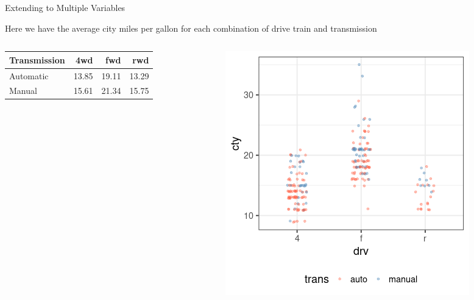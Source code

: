 \documentclass{beamer}
\begin{document}
\begin{frame}[fragile]{Extending to Multiple Variables}

Here we have the average city miles per gallon for each combination of drive train and transmission



\begin{columns}

  \begin{column}{0.45\textwidth}
  {\footnotesize
\begin{table}[ht]
\centering
\begin{tabular}{lrrr}
  \hline
Transmission & 4wd & fwd & rwd \\ 
  \hline
Automatic &  13.85 & 19.11 & 13.29 \\
Manual & 15.61 & 21.34 & 15.75 \\  \hline
\end{tabular}
\end{table}
}
  \end{column}
  \begin{column}{0.45\textwidth}
\includegraphics[scale=.4]{double_cat_pred1.png}
  \end{column}

\end{columns}

\end{frame}
\end{document}
